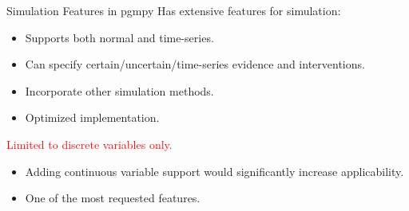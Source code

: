 \documentclass{beamer}
\begin{document}
\begin{frame}{Simulation Features in pgmpy}
	Has extensive features for simulation:
	\begin{itemize}
		\item Supports both normal and time-series.
		\item Can specify certain/uncertain/time-series evidence and interventions.
		\item Incorporate other simulation methods.
		\item Optimized implementation.
	\end{itemize}


	\vspace{2em}
	\centerline{\textcolor{red}{Limited to discrete variables only.}}
	\vspace{2em}
	\begin{itemize}
		\item Adding continuous variable support would significantly increase applicability.
		\item One of the most requested features.
	\end{itemize}



\end{frame}
\end{document}
